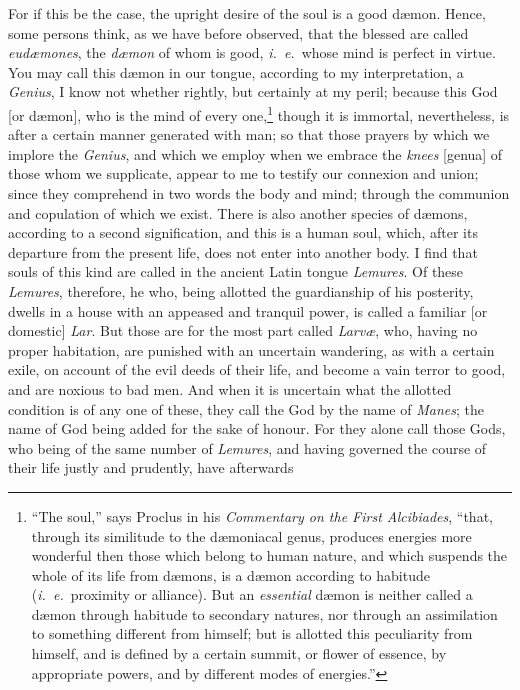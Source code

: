 \documentclass[twoside]{article}
\begin{document}
\noindent For if this be the case, the upright desire of the soul is a good
d{\ae}mon. Hence, some persons think, as we have before observed, that the
blessed are called \textit{eud{\ae}mones}, the \textit{d{\ae}mon} of whom is
good, \textit{i.~e.}~whose mind is perfect in virtue. You may call this
d{\ae}mon in our tongue, according to my interpretation, a \textit{Genius}, I
know not whether rightly, but certainly at my peril; because this God [or
d{\ae}mon], who is the mind of every one,\footnote{``The soul,'' says Proclus
in his \textit{Commentary on the First Alcibiades}, ``that, through its
similitude to the d{\ae}moniacal genus, produces energies more wonderful then
those which belong to human nature, and which suspends the whole of its life
from d{\ae}mons, is a d{\ae}mon according to habitude (\textit{i.~e.}~proximity
or alliance). But an \textit{essential} d{\ae}mon is neither called a d{\ae}mon
through habitude to secondary natures, nor through an assimilation to something
different from himself; but is allotted this peculiarity from himself, and is
defined by a certain summit, or flower of essence, by appropriate powers, and
by different modes of energies.''} though it is immortal, nevertheless, is
after a certain manner generated with man; so that those prayers by which we
implore the \textit{Genius}, and which we employ when we embrace the
\textit{knees} [genua] of those whom we supplicate, appear to me to testify our
connexion and union; since they comprehend in two words the body and mind;
through the communion and copulation of which we exist. There is also another
species of d{\ae}mons, according to a second signification, and this is a human
soul, which, after its departure from the present life, does not enter into
another body. I find that souls of this kind are called in the ancient Latin
tongue \textit{Lemures}. Of these \textit{Lemures}, therefore, he who, being
allotted the guardianship of his posterity, dwells in a house with an appeased
and tranquil power, is called a familiar [or domestic] \textit{Lar}. But those
are for the most part called \textit{Larv{\ae}}, who, having no proper
habitation, are punished with an uncertain wandering, as with a certain exile,
on account of the evil deeds of their life, and become a vain terror to good,
and are noxious to bad men. And when it is uncertain what the allotted
condition is of any one of these, they call the God by the name of
\textit{Manes}; the name of God being added for the sake of honour. For they
alone call those Gods, who being of the same number of \textit{Lemures}, and
having governed the course of their life justly and prudently, have afterwards
\end{document}
